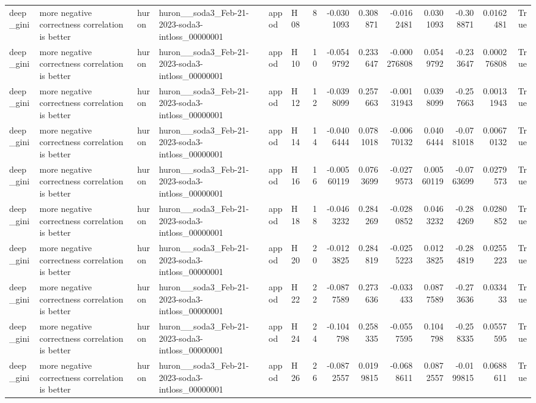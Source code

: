 \begin{longtable}{llllllrrrrrrrr}
deep\_gini & more negative correctness correlation is better & huron & huron\_\_soda3\_Feb-21-2023-soda3-intloss\_00000001 & appod & H08 & 8 & -0.0301093 & 0.308871 & -0.0162481 & 0.0301093 & -0.308871 & 0.0162481 & True \\
deep\_gini & more negative correctness correlation is better & huron & huron\_\_soda3\_Feb-21-2023-soda3-intloss\_00000001 & appod & H10 & 10 & -0.0549792 & 0.233647 & -0.000276808 & 0.0549792 & -0.233647 & 0.000276808 & True \\
deep\_gini & more negative correctness correlation is better & huron & huron\_\_soda3\_Feb-21-2023-soda3-intloss\_00000001 & appod & H12 & 12 & -0.0398099 & 0.257663 & -0.00131943 & 0.0398099 & -0.257663 & 0.00131943 & True \\
deep\_gini & more negative correctness correlation is better & huron & huron\_\_soda3\_Feb-21-2023-soda3-intloss\_00000001 & appod & H14 & 14 & -0.0406444 & 0.0781018 & -0.00670132 & 0.0406444 & -0.0781018 & 0.00670132 & True \\
deep\_gini & more negative correctness correlation is better & huron & huron\_\_soda3\_Feb-21-2023-soda3-intloss\_00000001 & appod & H16 & 16 & -0.00560119 & 0.0763699 & -0.0279573 & 0.00560119 & -0.0763699 & 0.0279573 & True \\
deep\_gini & more negative correctness correlation is better & huron & huron\_\_soda3\_Feb-21-2023-soda3-intloss\_00000001 & appod & H18 & 18 & -0.0463232 & 0.284269 & -0.0280852 & 0.0463232 & -0.284269 & 0.0280852 & True \\
deep\_gini & more negative correctness correlation is better & huron & huron\_\_soda3\_Feb-21-2023-soda3-intloss\_00000001 & appod & H20 & 20 & -0.0123825 & 0.284819 & -0.0255223 & 0.0123825 & -0.284819 & 0.0255223 & True \\
deep\_gini & more negative correctness correlation is better & huron & huron\_\_soda3\_Feb-21-2023-soda3-intloss\_00000001 & appod & H22 & 22 & -0.0877589 & 0.273636 & -0.033433 & 0.0877589 & -0.273636 & 0.033433 & True \\
deep\_gini & more negative correctness correlation is better & huron & huron\_\_soda3\_Feb-21-2023-soda3-intloss\_00000001 & appod & H24 & 24 & -0.104798 & 0.258335 & -0.0557595 & 0.104798 & -0.258335 & 0.0557595 & True \\
deep\_gini & more negative correctness correlation is better & huron & huron\_\_soda3\_Feb-21-2023-soda3-intloss\_00000001 & appod & H26 & 26 & -0.0872557 & 0.0199815 & -0.0688611 & 0.0872557 & -0.0199815 & 0.0688611 & True \\

\end{longtable}
